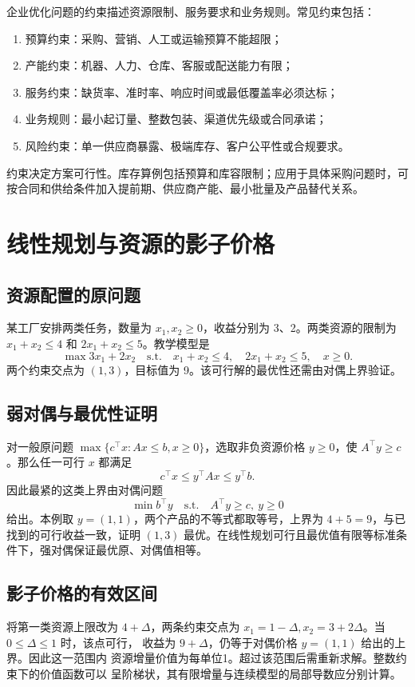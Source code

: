 企业优化问题的约束描述资源限制、服务要求和业务规则。常见约束包括：
\begin{enumerate}
  \item 预算约束：采购、营销、人工或运输预算不能超限；
  \item 产能约束：机器、人力、仓库、客服或配送能力有限；
  \item 服务约束：缺货率、准时率、响应时间或最低覆盖率必须达标；
  \item 业务规则：最小起订量、整数包装、渠道优先级或合同承诺；
  \item 风险约束：单一供应商暴露、极端库存、客户公平性或合规要求。
\end{enumerate}

约束决定方案可行性。库存算例包括预算和库容限制；应用于具体采购问题时，可按合同和供给条件加入提前期、供应商产能、最小批量及产品替代关系。

\section{线性规划与资源的影子价格}

\subsection{资源配置的原问题}
某工厂安排两类任务，数量为 \(x_1,x_2\ge0\)，收益分别为 3、2。两类资源的限制为 \(x_1+x_2\le4\) 和 \(2x_1+x_2\le5\)。教学模型是
\[
\max 3x_1+2x_2
\quad\text{s.t.}\quad
x_1+x_2\le4,\quad2x_1+x_2\le5,\quad x\ge0.
\]
两个约束交点为 \((1,3)\)，目标值为 9。该可行解的最优性还需由对偶上界验证。

\subsection{弱对偶与最优性证明}
对一般原问题 \(\max\{c^\top x:Ax\le b,x\ge0\}\)，选取非负资源价格 \(y\ge0\)，使 \(A^\top y\ge c\)。那么任一可行 \(x\) 都满足
\[
c^\top x\le y^\top Ax\le y^\top b.
\]
因此最紧的这类上界由对偶问题
\[
\min b^\top y\quad\text{s.t.}\quad A^\top y\ge c,\ y\ge0
\]
给出。本例取 \(y=(1,1)\)，两个产品的不等式都取等号，上界为 \(4+5=9\)，与已找到的可行收益一致，证明 \((1,3)\) 最优。在线性规划可行且最优值有限等标准条件下，强对偶保证最优原、对偶值相等\cite{bertsimas1997}。

\subsection{影子价格的有效区间}
将第一类资源上限改为 \(4+\Delta\)，两条约束交点为
\(x_1=1-\Delta,x_2=3+2\Delta\)。当 \(0\le\Delta\le1\) 时，该点可行，
收益为 \(9+\Delta\)，仍等于对偶价格 \(y=(1,1)\) 给出的上界。因此这一范围内
资源增量价值为每单位1。超过该范围后需重新求解。整数约束下的价值函数可以
呈阶梯状，其有限增量与连续模型的局部导数应分别计算。


